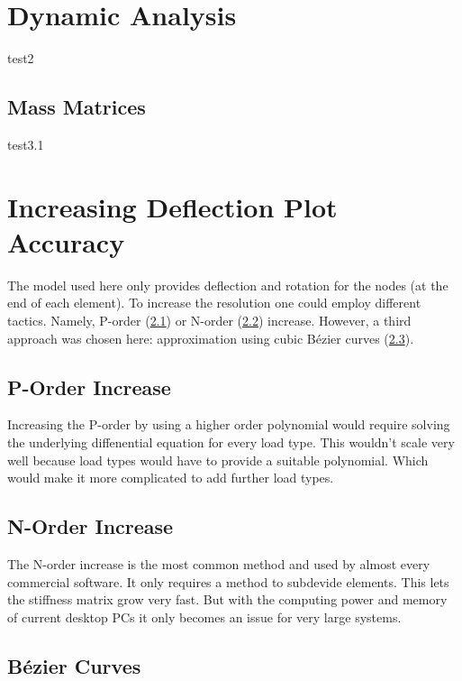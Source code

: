 \section{Dynamic Analysis}
\label{sec:dynAna}

test2

\subsection{Mass Matrices}
\label{sec:section3.1}

test3.1

\section{Increasing Deflection Plot Accuracy}
\label{sec:deflplotaccu}

The model used here only provides deflection and rotation for the nodes (at the end of each element). To increase the resolution one could employ different tactics.
Namely, P-order (\cref{subsec:porder}) or N-order (\cref{subsec:norder}) increase.
However, a third approach was chosen here: approximation using cubic B\'{e}zier curves (\cref{subsec:bezier}).

\subsection{P-Order Increase}
\label{subsec:porder}

Increasing the P-order by using a higher order polynomial would require solving the underlying diffenential equation for every load type.
This wouldn't scale very well because load types would have to provide a suitable polynomial. Which would make it more complicated to add further load types. 

\subsection{N-Order Increase}
\label{subsec:norder}

The N-order increase is the most common method and used by almost every commercial software. It only requires a method to subdevide elements.
This lets the stiffness matrix grow very fast. But with the computing power and memory of current desktop PCs it only becomes an issue for very large systems.

\subsection{B\'{e}zier Curves}
\label{subsec:bezier}

